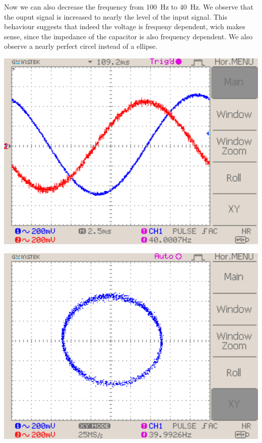 \documentclass[a4paper,10pt]{article}
\newenvironment{Figure}
        {\par\medskip\noindent\minipage{\linewidth}}
        {\endminipage\par\medskip}
\numberwithin{equation}{section}
\begin{document}
\begin{multicols}{2}
	Now we can also decrease the frequency from \SI{100}{Hz} to \SI{40}{Hz}. We observe that the ouput signal is increased to nearly the level of the input signal. This behaviour suggests that indeed the voltage is frequeny dependent, wich makes sense, since the impedance of the capacitor is also frequency dependent. We also observe a nearly perfect circel instead of a ellipse.
	\begin{Figure}
		\centering
		\includegraphics[width=1\textwidth]{../data/DS0045_n.png}
		\label{fig:int12}
	\end{Figure}
	\begin{Figure}
		\centering
		\includegraphics[width=1\textwidth]{../data/DS0044_n.png}
		\label{fig:int13}
	\end{Figure}


\end{multicols}
\end{document}
